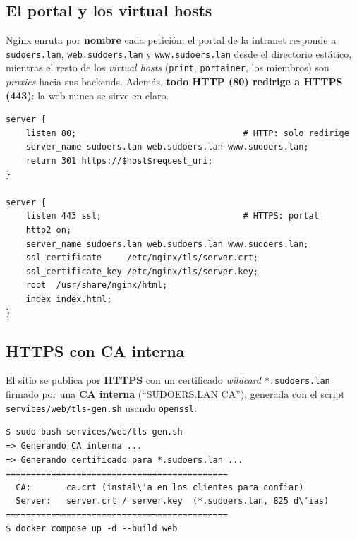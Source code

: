 \subsection{El portal y los virtual hosts}

Nginx enruta por \textbf{nombre} cada petici\'on: el portal de la intranet
responde a \texttt{sudoers.lan}, \texttt{web.sudoers.lan} y
\texttt{www.sudoers.lan} desde el directorio est\'atico, mientras el resto de
los \textit{virtual hosts} (\texttt{print}, \texttt{portainer}, los miembros)
son \textit{proxies} hacia sus backends. Adem\'as, \textbf{todo HTTP (80)
redirige a HTTPS (443)}: la web nunca se sirve en claro.

\begin{lstlisting}[style=terminal]
server {
    listen 80;                                 # HTTP: solo redirige
    server_name sudoers.lan web.sudoers.lan www.sudoers.lan;
    return 301 https://$host$request_uri;
}

server {
    listen 443 ssl;                            # HTTPS: portal
    http2 on;
    server_name sudoers.lan web.sudoers.lan www.sudoers.lan;
    ssl_certificate     /etc/nginx/tls/server.crt;
    ssl_certificate_key /etc/nginx/tls/server.key;
    root  /usr/share/nginx/html;
    index index.html;
}
\end{lstlisting}


\subsection{HTTPS con CA interna}

El sitio se publica por \textbf{HTTPS} con un certificado \textit{wildcard}
\texttt{*.sudoers.lan} firmado por una \textbf{CA interna} (``SUDOERS.LAN
CA''), generada con el script \texttt{services/web/tls-gen.sh} usando
\texttt{openssl}:

\begin{lstlisting}[style=terminal]
$ sudo bash services/web/tls-gen.sh
=> Generando CA interna ...
=> Generando certificado para *.sudoers.lan ...
============================================
  CA:       ca.crt (instal\'a en los clientes para confiar)
  Server:   server.crt / server.key  (*.sudoers.lan, 825 d\'ias)
============================================
$ docker compose up -d --build web
\end{lstlisting}

